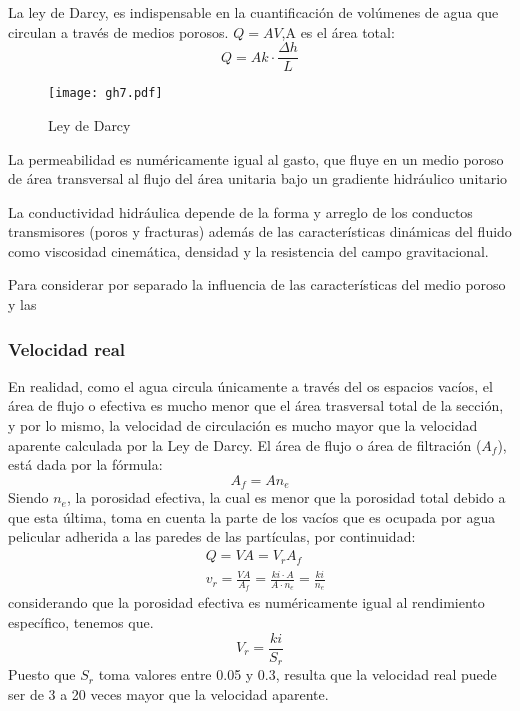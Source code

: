 La ley de Darcy, es indispensable en la cuantificación de volúmenes de agua que circulan a través de medios porosos. $Q=AV$,A es el área total:
\begin{equation}
    Q=Ak\cdot \frac{\Delta h}{L}
\end{equation}
\begin{figure}[h!]
\centering
  \texttt{[image: gh7.pdf]}
  \caption{Ley de Darcy}
  \label{gh7}
\end{figure}
La permeabilidad es numéricamente igual al gasto, que fluye en un medio poroso de área transversal al flujo del área unitaria bajo un gradiente hidráulico unitario

La conductividad hidráulica depende de la forma y arreglo de los conductos transmisores (poros y fracturas) además de las características dinámicas del fluido como viscosidad cinemática, densidad y la resistencia del campo gravitacional.

Para considerar por separado la influencia de las características del medio poroso y las

\subsubsection{Velocidad real}
En realidad, como el agua circula únicamente a través del os espacios vacíos, el área de flujo o efectiva es mucho menor que el área trasversal total de la sección, y por lo mismo, la velocidad de circulación es mucho mayor que la velocidad aparente calculada por la Ley de Darcy. El área de flujo o área de filtración ($A_f$), está dada por la fórmula:
\begin{equation}
    A_f= An_e
\end{equation}
Siendo $n_e$, la porosidad efectiva, la cual es menor que la porosidad total debido a que esta última, toma en cuenta la parte de los vacíos que es ocupada por agua pelicular adherida a las paredes de las partículas, por continuidad:
\begin{align}
    &Q = VA =V_rA_f\\
    &v_r=\frac{VA}{A_f}=\frac{ki\cdot A}{A\cdot n_e}=\frac{ki}{n_e}
\end{align}
considerando que la porosidad efectiva es numéricamente igual al rendimiento específico, tenemos que.
\begin{equation}
    V_r =\frac{ki}{S_r}
\end{equation}
Puesto que $S_r$ toma valores entre 0.05 y 0.3, resulta que la velocidad real puede ser de 3 a 20 veces mayor que la velocidad aparente.

